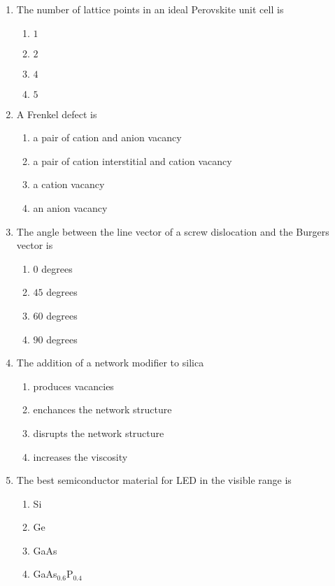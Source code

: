 \documentclass[journal,12pt,onecolumn]{IEEEtran}
\theoremstyle{remark}
\begin{document}
\begin{enumerate}

\item The number of lattice points in an ideal Perovskite unit cell is

\begin{enumerate}
	\item $1$
	\item $2$
	\item $4$
	\item $5$
\end{enumerate}

\item A Frenkel defect is

\begin{enumerate}
	\item a pair of cation and anion vacancy
	\item a pair of cation interstitial and cation vacancy
	\item a cation vacancy
	\item an anion vacancy
\end{enumerate}

\item The angle between the line vector of a screw dislocation and the Burgers vector is

\begin{enumerate}
	\item $0$ degrees
	\item $45$ degrees
	\item $60$ degrees
	\item $90$ degrees
\end{enumerate}

\item The addition of a network modifier to silica

\begin{enumerate}
	\item produces vacancies
	\item enchances the network structure
	\item disrupts the network structure
	\item increases the viscosity
\end{enumerate}

\item The best semiconductor material for LED in the visible range is

\begin{enumerate}
	\item Si
	\item Ge
	\item GaAs
	\item GaAs$_0.6$P$_0.4$
\end{enumerate}


\end{enumerate}
\end{document}

